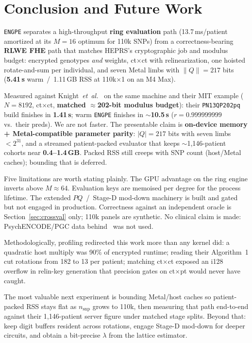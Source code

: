 \documentclass[11pt,a4paper]{article}
\newcommand{\engpe}{\texttt{ENGPE}}
\DeclareRobustCommand{\code}[1]{\texttt{#1}}
\begin{document}
\section{Conclusion and Future Work}
\label{sec:conclusion}

\engpe{} separates a high-throughput \textbf{ring evaluation} path
(13.7\,ms/patient amortized at its $M{=}16$ optimum for 110k SNPs) from a
correctness-bearing \textbf{RLWE FHE} path that matches HEPRS's cryptographic job
and modulus budget: encrypted genotypes \textit{and} weights, ct$\times$ct with
relinearization, one hoisted rotate-and-sum per individual, and seven Metal limbs
with $\|Q\| = 217$ bits (\textbf{5.41\,s} warm~/~1.11\,GB RSS at 110k$\times$1 on
an M4 Max).

Measured against Knight~\textit{et~al.}~\cite{knight2026heprs} on the same machine
and their MIT example ($N{=}8192$, ct$\times$ct, \textbf{matched $\approx$202-bit
modulus budget}): their \code{PN13QP202pq} build finishes in \textbf{1.41\,s}; warm
\engpe{} finishes in \textbf{$\sim$10.5\,s} ($r = 0.999999999$ vs.\ their preds).
We are not faster. The presentable claim is \textbf{on-device memory +
Metal-compatible parameter parity}: $|Q| = 217$ bits with seven limbs $< 2^{31}$,
and a streamed patient-packed evaluator that keeps $\sim$1{,}146-patient cohorts
near \textbf{0.4--1.4\,GB}. Packed RSS still creeps with SNP count (host/Metal
caches); bounding that is deferred.

Five limitations are worth stating plainly. The GPU advantage on the ring engine
inverts above $M \approx 64$. Evaluation keys are memoised per degree for the
process lifetime. The extended $PQ$~/~Stage-D mod-down machinery is built and gated
but not engaged in production. Correctness against an independent oracle is
Section~\ref{sec:crossval} only; 110k panels are synthetic. No clinical claim is
made: PsychENCODE/PGC data behind~\cite{knight2026heprs} was not used.

Methodologically, profiling redirected this work more than any kernel did: a
quadratic host multiply was 90\% of encrypted runtime; reading their Algorithm~1
cut rotations from 182 to 13 per patient; matching ct$\times$ct exposed an i128
overflow in relin-key generation that precision gates on ct$\times$pt would never
have caught.

The most valuable next experiment is bounding Metal/host caches so patient-packed
RSS stays flat as $n_{\mathrm{snp}}$ grows to 110k, then measuring that path
end-to-end against their 1{,}146-patient server figure under matched stage splits.
Beyond that: keep digit buffers resident across rotations, engage Stage-D mod-down
for deeper circuits, and obtain a bit-precise $\lambda$ from the lattice
estimator.



\end{document}
